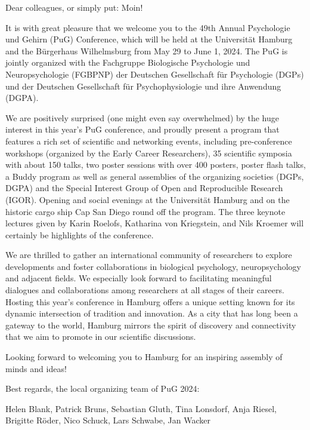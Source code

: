Dear colleagues, or simply put: Moin!
 
It is with great pleasure that we welcome you to the 49th Annual Psychologie und Gehirn (PuG) Conference, which will be held at the Universität Hamburg and the Bürgerhaus Wilhelmsburg from May 29 to June 1, 2024. The PuG is jointly organized with the Fachgruppe Biologische Psychologie und Neuropsychologie (FGBPNP) der Deutschen Gesellschaft für Psychologie  (DGPs) und der Deutschen Gesellschaft für Psychophysiologie und ihre Anwendung (DGPA).
 
We are positively surprised (one might even say overwhelmed) by the huge interest in this year’s PuG conference, and proudly present a program that features a rich set of scientific and networking events, including pre-conference workshops (organized by the Early Career Researchers), 35 scientific symposia with about 150 talks, two poster sessions with over 400 posters, poster flash talks, a Buddy program as well as general assemblies of the organizing societies (DGPs, DGPA) and the Special Interest Group of Open and Reproducible Research (IGOR). Opening and social evenings at the Universität Hamburg and on the historic cargo ship Cap San Diego round off the program. The three keynote lectures given by Karin Roelofs, Katharina von Kriegstein, and Nils Kroemer will certainly be highlights of the conference.
 
We are thrilled to gather an international community of researchers to explore developments and foster collaborations in biological psychology, neuropsychology and adjacent fields. We especially look forward to facilitating meaningful dialogues and collaborations among researchers at all stages of their careers. Hosting this year's conference in Hamburg offers a unique setting known for its dynamic intersection of tradition and innovation. As a city that has long been a gateway to the world, Hamburg mirrors the spirit of discovery and connectivity that we aim to promote in our scientific discussions.
 
Looking forward to welcoming you to Hamburg for an inspiring assembly of minds and ideas!
 
Best regards, the local organizing team of PuG 2024:

Helen Blank, Patrick Bruns, Sebastian Gluth, Tina Lonsdorf, Anja Riesel, Brigitte Röder, Nico Schuck, Lars Schwabe, Jan Wacker

\newpage
